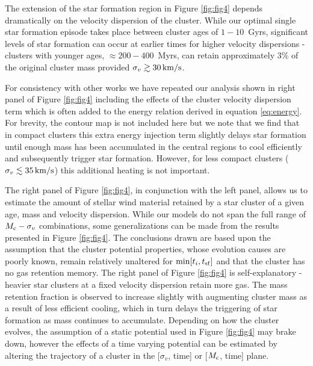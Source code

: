 \documentclass[fleqn,usenatbib]{mnras}
\begin{document}
The extension of the star formation region in Figure \ref{fig:fig4} depends dramatically on the velocity dispersion of the cluster.  While our optimal  single star formation episode takes place  between cluster ages of $1-10$~Gyrs, significant levels of star formation can occur  at earlier times for higher velocity dispersions - clusters with younger ages, $\approx 200-400$~Myrs, can retain approximately 3\% of the original cluster mass provided $\sigma_v \gtrsim 30 \, {\rm km/s}$.

For consistency with other works we have repeated our analysis shown in right panel of Figure \ref{fig:fig4} including the effects of the cluster velocity dispersion term which is often added to the energy relation derived in equation \ref{eq:energy}.  For brevity, the contour map is not included here but we note that we find that in compact clusters this extra energy injection term slightly delays star formation until enough mass has been accumulated in the central regions to cool efficiently and subsequently  trigger star formation.  However, for less compact clusters ($\sigma_v \lesssim 35 \, {\rm km/s}$) this additional heating is not important.  

The right panel of Figure \ref{fig:fig4}, in conjunction with the left panel, allows us to estimate  the amount of stellar wind material retained by a star cluster of a given age, mass and velocity dispersion. 
While our models do not span the full range of $M_{\rm c} - \sigma_v$ combinations,  some generalizations can be made  from the results presented in Figure \ref{fig:fig4}.
The conclusions drawn are based upon the assumption that the cluster potential properties, whose evolution causes are poorly known, remain relatively unaltered for $\min [t_i,t_{\rm sf}]$ and that the cluster has no gas retention memory.
The right panel of Figure  \ref{fig:fig4} is self-explanatory - heavier star clusters at a fixed velocity dispersion retain more gas. The mass retention fraction  is observed to  increase slightly  with augmenting  cluster mass as a result of less efficient cooling, which in turn delays the triggering of star formation as mass continues to accumulate.
 Depending on how the cluster evolves, the assumption of a static potential used in Figure \ref{fig:fig4} may brake down, however the effects of a time varying potential can be estimated by altering the trajectory of a cluster in the [$\sigma_v$, time]   or  [$M_{\rm c}$, time] plane.
 
\end{document}
